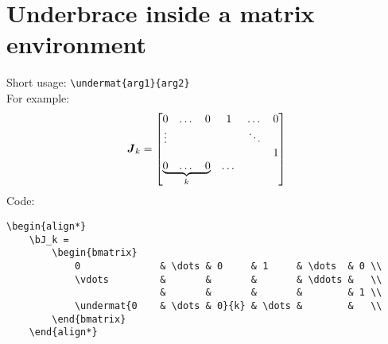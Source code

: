 \documentclass{article}
\begin{document}
	\newpage
	\section{Underbrace inside a matrix environment}
	Short usage: \verb|\undermat{arg1}{arg2}| \\
	For example:
	\begin{align*}
	\bJ_k = 
		\begin{bmatrix}
			0              & \dots & 0     & 1     & \dots  & 0 \\
			\vdots         &       &       &       & \ddots &   \\
			               &       &       &       &        & 1 \\
			\undermat{0    & \dots & 0}{k} & \dots &        &   \\
		\end{bmatrix}
	\end{align*}
	Code:
	\begin{Verbatim}[tabsize=4]
	\begin{align*}
	\bJ_k = 
		\begin{bmatrix}
			0              & \dots & 0     & 1     & \dots  & 0 \\
			\vdots         &       &       &       & \ddots &   \\
			               &       &       &       &        & 1 \\
			\undermat{0    & \dots & 0}{k} & \dots &        &   \\
		\end{bmatrix}
	\end{align*}
	\end{Verbatim}
	
\end{document}
